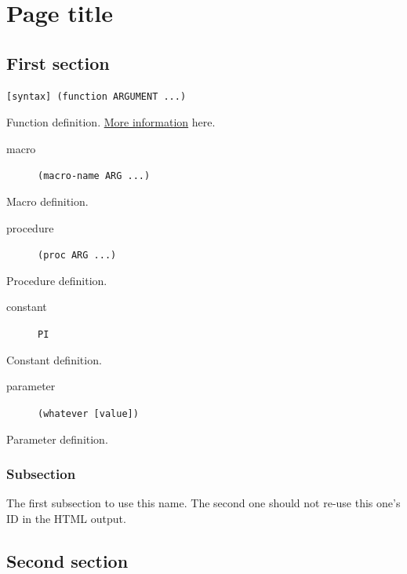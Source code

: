 \documentclass[12pt]{article}
\begin{document}
\section{Page title}\label{page-title}

\subsection{First section}\label{first-section}

\begin{verbatim}
[syntax] (function ARGUMENT ...)
\end{verbatim}

Function definition. \href{http://example.com/foo}{More information}
here.

\begin{description}
\item[macro] \texttt{(macro-name ARG ...)}
\end{description}

Macro definition.

\begin{description}
\item[procedure] \texttt{(proc ARG ...)}
\end{description}

Procedure definition.

\begin{description}
\item[constant] \texttt{PI}
\end{description}

Constant definition.

\begin{description}
\item[parameter] \texttt{(whatever [value])}
\end{description}

Parameter definition.

\subsubsection{Subsection}\label{subsection}

The first subsection to use this name. The second one should not re-use
this one's ID in the HTML output.

\subsection{Second section}\label{second-section}
\end{document}
